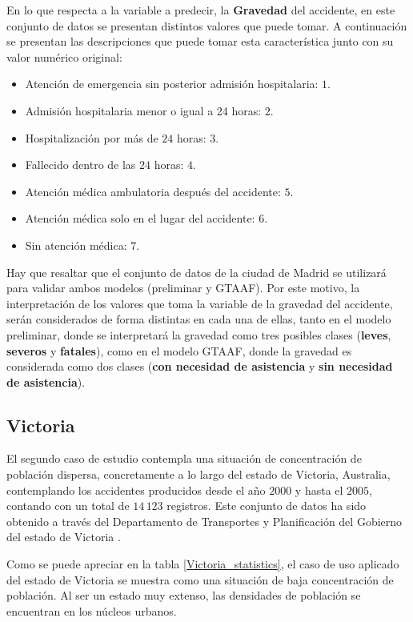 \documentclass{uathesis-es}
\begin{document}
{En lo que respecta a la variable a predecir, la \textbf{Gravedad} del accidente, en este conjunto de datos se presentan distintos valores que puede tomar. A continuación se presentan las descripciones que puede tomar esta característica junto con su valor numérico original:

\begin{itemize}
    \item Atención de emergencia sin posterior admisión hospitalaria: $1$.
    \item Admisión hospitalaria menor o igual a 24 horas: $2$.
    \item Hospitalización por más de $24$ horas: $3$.
    \item Fallecido dentro de las $24$ horas: $4$.
    \item Atención médica ambulatoria después del accidente: $5$.
    \item Atención médica solo en el lugar del accidente: $6$.
    \item Sin atención médica: $7$.
\end{itemize}

Hay que resaltar que el conjunto de datos de la ciudad de Madrid se utilizará para validar ambos modelos (preliminar y GTAAF). Por este motivo, la interpretación de los valores que toma la variable de la gravedad del accidente, serán considerados de forma distintas en cada una de ellas, tanto en el modelo preliminar, donde se interpretará la gravedad como tres posibles clases (\textbf{leves}, \textbf{severos} y \textbf{fatales}), como en el modelo GTAAF, donde la gravedad es considerada como dos clases (\textbf{con necesidad de asistencia} y \textbf{sin necesidad de asistencia}).


\subsection*{Victoria}

El segundo caso de estudio contempla una situación de concentración de población dispersa, concretamente a lo largo del estado de Victoria, Australia, contemplando los accidentes producidos desde el año $2000$ y hasta el $2005$, contando con un total de $14\,123$ registros. Este conjunto de datos ha sido obtenido a través del Departamento de Transportes y Planificación del Gobierno del estado de Victoria \cite{InfoDatasetVictoria}.

Como se puede apreciar en la tabla \ref{Victoria_statistics}, el caso de uso aplicado del estado de Victoria se muestra como una situación de baja concentración de población. Al ser un estado muy extenso, las densidades de población se encuentran en los núcleos urbanos.

}
\end{document}
